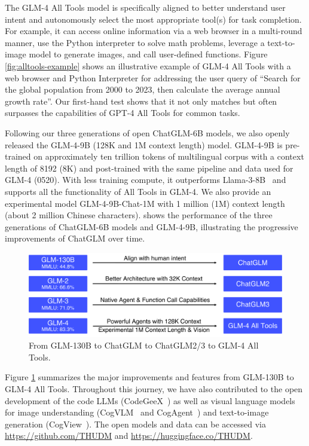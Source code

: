

The GLM-4 All Tools model is specifically aligned to better understand user intent and autonomously select the most appropriate tool(s) for task completion. 
For example, it can access online information via a web browser in a multi-round manner, use the Python interpreter to solve math problems, leverage a text-to-image model to generate images, and  call user-defined functions. 
Figure \ref{fig:alltools-example} shows an illustrative example of GLM-4 All Tools with a web browser and Python Interpreter for addressing the user query of ``Search for the global population from 2000 to 2023, then calculate the average annual growth rate''.  
Our first-hand test shows that it not only matches but often surpasses the capabilities of GPT-4 All Tools for common tasks. 





Following our three generations of open ChatGLM-6B models, we also openly released the GLM-4-9B (128K and 1M context length) model. 
GLM-4-9B is pre-trained on approximately ten trillion tokens of multilingual corpus with a context length of 8192 (8K) and post-trained with the same pipeline and data used for GLM-4 (0520). 
With less training compute, it outperforms Llama-3-8B~\cite{llama3} and  supports all the functionality of All Tools in GLM-4. 
We also provide an experimental model GLM-4-9B-Chat-1M with 1 million (1M) context length (about 2 million Chinese characters). 
 shows the performance of the three generations of ChatGLM-6B models and GLM-4-9B, illustrating the progressive improvements of ChatGLM over time.  


 
\begin{figure}[!ht]
    \centering
    \includegraphics[width=.75\linewidth]{figs/glm130toglm4-2.pdf}
    \caption{From GLM-130B to ChatGLM to ChatGLM2/3 to GLM-4 All Tools. %
    }
    \label{fig:glm130-glm4at}
\end{figure}


Figure \ref{fig:glm130-glm4at} summarizes the major improvements and features from GLM-130B to GLM-4 All Tools. 
Throughout this journey, we have also contributed to the open development of the code LLMs (CodeGeeX~\cite{zheng2023codegeex}) as well as visual language models for image understanding (CogVLM~\cite{wang2023cogvlm} and CogAgent~\cite{hong2023cogagent}) and text-to-image generation (CogView~\cite{ding2021cogview,zheng2024cogview3}). 
The open models and data can be accessed via \url{https://github.com/THUDM} and \url{https://huggingface.co/THUDM}. 
 




